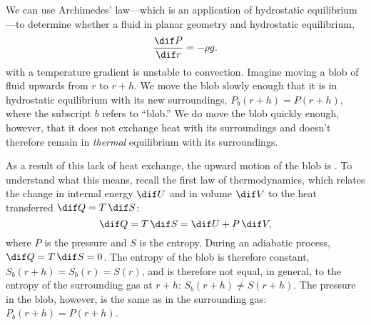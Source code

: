 We can use Archimedes' law---which is an application of hydrostatic equilibrium---to determine whether a fluid in planar geometry and hydrostatic equilibrium,
\begin{equation}
\frac{\dif P}{\dif r} = -\rho g.
\end{equation}
with a temperature gradient is unstable to convection. Imagine moving a blob of fluid upwards from $r$ to $r+h$.  We move the blob slowly enough that it is in hydrostatic equilibrium with its new surroundings, $P_{b}(r+h) = P(r+h)$, where the subscript $b$ refers to ``blob.'' We do move the blob quickly enough, however, that it does not exchange heat with its surroundings and doesn't therefore remain in \emph{thermal} equilibrium with its surroundings. 

As a result of this lack of heat exchange, the upward motion of the blob is .  To understand what this means, recall the first law of thermodynamics, which relates the change in internal energy $\dif U$ and in volume $\dif V$ to the heat transferred $\dif Q = T\,\dif S$:
\begin{equation}\label{e.first-law-thermo}
	\dif Q = T\,\dif S = \dif U + P\,\dif V,
\end{equation}
where $P$ is the pressure and $S$ is the entropy. During an adiabatic process, $\dif Q = T\,\dif S = 0$. The entropy of the blob is therefore constant, 
$S_{b}(r+h) = S_{b}(r) = S(r)$, and is therefore not equal, in general, to the entropy of the surrounding gas at $r+h$: $S_{b}(r+h)  \neq S(r+h)$. The pressure in the blob, however, is the same as in the surrounding gas: $P_{b}(r+h) = P(r+h)$.

